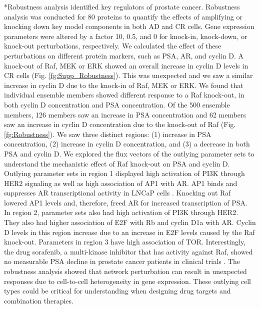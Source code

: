 \documentclass[12pt]{article}
\makeatletter
\renewcommand\subsection{\@startsection
	{subsection}{2}{0mm}
	{-0.05in}
	{-0.5\baselineskip}
	{\normalfont\normalsize\bfseries}}
\makeatother
\begin{document}
\subsection*{Robustness analysis identified key regulators of prostate cancer.} 
Robustness analysis was conducted for 80 proteins to quantify the effects of amplifying or knocking down key model components in both AD and CR cells. 
Gene expression parameters were altered by a factor 10, 0.5, and 0 for knock-in, knock-down, or knock-out perturbations, respectively.
We calculated the effect of these perturbations on different protein markers, such as PSA, AR, and cyclin D. 
A knock-out of Raf, MEK or ERK showed an overall increase in cyclin D levels in CR cells (Fig. \ref{fg:Supp_Robustness}). 
This was unexpected and we saw a similar increase in cyclin D due to the knock-in of Raf, MEK or ERK. 
We found that individual ensemble members showed different response to a Raf knock-out, in both cyclin D concentration and PSA concentration. 
Of the 500 ensemble members, 126 members saw an increase in PSA concentration and 62 members saw an increase in cyclin D concentration due to the knock-out of Raf (Fig. \ref{fg:Robustness}). 
We saw three distinct regions: (1) increase in PSA concentration, (2) increase in cyclin D concentration, and (3) a decrease in both PSA and cyclin D. 
We explored the flux vectors of the outlying parameter sets to understand the mechanistic effect of Raf knock-out on PSA and cyclin D. 
Outlying parameter sets in region 1 displayed high activation of PI3K through HER2 signaling as well as high association of AP1 with AR. 
AP1 binds and suppresses AR transcriptional activity in LNCaP cells \cite{Sato1997}. 
Knocking out Raf lowered AP1 levels and, therefore, freed AR for increased transcription of PSA.
In region 2, parameter sets also had high activation of PI3K through HER2. 
They also had higher association of E2F with Rb and cyclin D1a with AR. 
Cyclin D levels in this region increase due to an increase in E2F levels caused by the Raf knock-out. 
Parameters in region 3 have high association of TOR. 
Interestingly, the drug sorafenib, a multi-kinase inhibitor that has activity against Raf, showed no measurable PSA decline in prostate cancer patients in clinical trials \cite{Dahut2008}. 
The robustness analysis showed that network perturbation can result in unexpected responses due to cell-to-cell heterogeneity in gene expression. 
These outlying cell types could be critical for understanding when designing drug targets and combination therapies.
\end{document}
